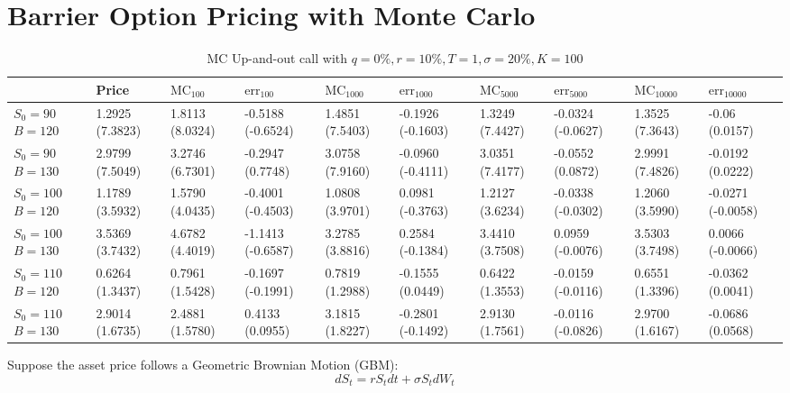 \chapter{Barrier Option Pricing with Monte Carlo}
\begin{center}
	\begin{table}[H]
		\begin{tabular}{ | m{4em} | m{1.4cm}| m{1.4cm} | m{1.4cm}| m{1.4cm} | m{1.37cm} | m{1.4cm} | m{1.4cm} | m{1.4cm} | m{1.45cm} |} 
			\hline
			& Price & $\text{MC}_{100}$ & $\text{err}_{100}$ & $\text{MC}_{1000}$ & $\text{err}_{1000}$ & $\text{MC}_{5000}$ & $\text{err}_{5000}$ & $\text{MC}_{10000}$ & $\text{err}_{10000}$  \\ 
			\hline
			$S_0=90$ $B=120$ & 1.2925 (7.3823) & 1.8113 (8.0324)  & -0.5188 (-0.6524) & 1.4851 (7.5403) & -0.1926 (-0.1603) & 1.3249 (7.4427) & -0.0324 (-0.0627) & 1.3525 (7.3643) & -0.06 (0.0157) \\ 
			\hline
			$S_0=90$ $B=130$ & 2.9799 (7.5049) & 3.2746 (6.7301) & -0.2947 (0.7748) & 3.0758 (7.9160) & -0.0960 (-0.4111) &  3.0351 (7.4177) & -0.0552 (0.0872) & 2.9991 (7.4826) & -0.0192 (0.0222) \\ 
			\hline
			$S_0=100$ $B=120$ & 1.1789 (3.5932) & 1.5790 (4.0435) & -0.4001 (-0.4503) & 1.0808 (3.9701)  & 0.0981 (-0.3763) & 1.2127 (3.6234) & -0.0338 (-0.0302) & 1.2060 (3.5990) & -0.0271 (-0.0058) \\ 
			\hline
			$S_0=100$ $B=130$ & 3.5369 (3.7432) & 4.6782 (4.4019)  & -1.1413 (-0.6587) & 3.2785 (3.8816) & 0.2584 (-0.1384) & 3.4410 (3.7508) & 0.0959 (-0.0076) & 3.5303 (3.7498)  & 0.0066 (-0.0066)\\ 
			\hline 
			$S_0=110$ $B=120$ & 0.6264 (1.3437) & 0.7961 (1.5428) & -0.1697 (-0.1991) & 0.7819 (1.2988) & -0.1555 (0.0449) & 0.6422 (1.3553) & -0.0159 (-0.0116) & 0.6551 (1.3396) & -0.0362 (0.0041) \\
			\hline
			$S_0=110$ $B=130$ & 2.9014 (1.6735) & 2.4881 (1.5780)  & 0.4133 (0.0955) & 3.1815 (1.8227) & -0.2801 (-0.1492) & 2.9130 (1.7561) & -0.0116 (-0.0826) & 2.9700 (1.6167) & -0.0686 (0.0568)\\
		\hline
		\end{tabular}
		\caption{MC Up-and-out call with $q=0\%,r=10\%, T=1,\sigma=20\%,K=100$}
		\label{tab:MC_barrer}
	\end{table}
\end{center}
Suppose the asset price follows a Geometric Brownian Motion (GBM):
\begin{equation}\label{eq:GBM}
	dS_t=rS_tdt+\sigma S_tdW_t
\end{equation}
